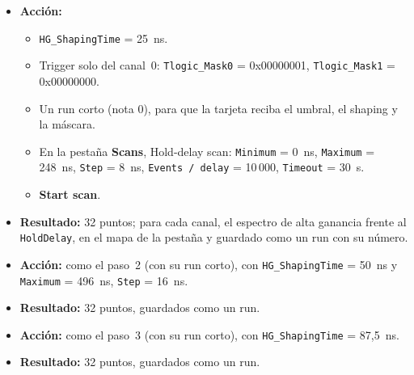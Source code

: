 \documentclass[11pt,a4paper]{article}
\begin{document}
\begin{itemize}
\item {\bf Acción:}
  \begin{itemize}
  \item \texttt{HG\_ShapingTime} = 25~ns.
  \item Trigger solo del canal~0: \texttt{Tlogic\_Mask0} = 0x00000001,
    \texttt{Tlogic\_Mask1} = 0x00000000.
  \item Un run corto (nota 0), para que la tarjeta reciba el umbral, el
    shaping y la máscara.
  \item En la pestaña {\bf Scans}, Hold-delay scan: \texttt{Minimum} = 0~ns,
    \texttt{Maximum} = 248~ns, \texttt{Step} = 8~ns, \texttt{Events / delay}
    = 10\,000, \texttt{Timeout} = 30~s.
  \item {\bf Start scan}.
  \end{itemize}
\item {\bf Resultado:} 32 puntos; para cada canal, el espectro de alta
  ganancia frente al \texttt{HoldDelay}, en el mapa de la pestaña y
  guardado como un run con su número.
\end{itemize}

\begin{itemize}
\item {\bf Acción:} como el paso~2 (con su run corto), con
  \texttt{HG\_ShapingTime} = 50~ns y \texttt{Maximum} = 496~ns,
  \texttt{Step} = 16~ns.
\item {\bf Resultado:} 32 puntos, guardados como un run.
\end{itemize}

\begin{itemize}
\item {\bf Acción:} como el paso~3 (con su run corto), con
  \texttt{HG\_ShapingTime} = 87,5~ns.
\item {\bf Resultado:} 32 puntos, guardados como un run.
\end{itemize}
\end{document}
